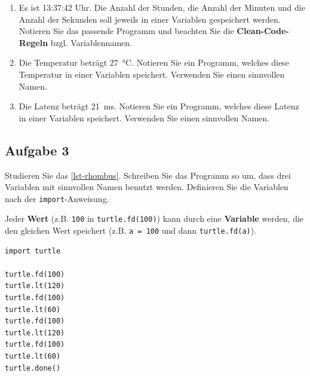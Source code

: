 \begin{enumerate}

\item Es ist 13:37:42 Uhr. Die Anzahl der Stunden, die Anzahl der Minuten und die Anzahl der Sekunden soll jeweils in einer Variablen gespeichert werden. Notieren Sie das passende Programm und beachten Sie die \textbf{Clean-Code-Regeln} bzgl. Variablennamen.
\fillwithgrid{0.75in}

\item Die Temperatur beträgt \qty{27}{\degreeCelsius}. Notieren Sie ein Programm, welches diese Temperatur in einer Variablen speichert. Verwenden Sie einen sinnvollen Namen.
\fillwithgrid{0.25in}

\item Die Latenz beträgt \qty{21}{\ms}. Notieren Sie ein Programm, welches diese Latenz in einer Variablen speichert. Verwenden Sie einen sinnvollen Namen.
\fillwithgrid{0.25in}

\end{enumerate}

\subsection{Aufgabe 3}

Studieren Sie das \autoref{lst-rhombus}. Schreiben Sie das Programm so um, dass drei Variablen mit sinnvollen Namen benutzt werden. Definieren Sie die Variablen nach der \lstinline{import}-Anweisung.

\begin{important}
Jeder \textbf{Wert} (z.B. \lstinline{100} in \lstinline{turtle.fd(100)}) kann durch eine \textbf{Variable}  werden, die den gleichen Wert speichert (z.B. \lstinline{a = 100} und dann \lstinline{turtle.fd(a)}).
\end{important}

\begin{minipage}{0.35\textwidth}
\centering
\begin{lstlisting}[caption={Ein Rhombus.}, label={lst-rhombus}]
import turtle

turtle.fd(100)
turtle.lt(120)
turtle.fd(100)
turtle.lt(60)
turtle.fd(100)
turtle.lt(120)
turtle.fd(100)
turtle.lt(60)
turtle.done()
\end{lstlisting}
\end{minipage}
\hfill
\begin{minipage}{0.55\textwidth}
\centering
\fillwithgrid{2.75in}
\end{minipage}